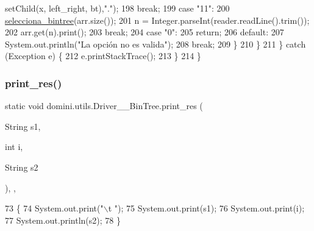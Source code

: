 \begin{DoxyCode}
      setChild(x, left\_right, bt),\textcolor{stringliteral}{"."});
198                     \textcolor{keywordflow}{break};
199                     \textcolor{keywordflow}{case} \textcolor{stringliteral}{"11"}:
200                         \hyperlink{classdomini_1_1utils_1_1Driver____BinTree_a0d90bf2cb928174547e712140b5a4fe5}{selecciona\_bintree}(arr.size());
201                         n = Integer.parseInt(reader.readLine().trim());
202                         arr.get(n).print();
203                     \textcolor{keywordflow}{break};
204                     \textcolor{keywordflow}{case} \textcolor{stringliteral}{"0"}:
205                         \textcolor{keywordflow}{return};
206                     \textcolor{keywordflow}{default}:
207                         System.out.println(\textcolor{stringliteral}{"La opción no es valida"});
208                     \textcolor{keywordflow}{break};
209                 \}
210             \}
211         \} \textcolor{keywordflow}{catch} (Exception e) \{
212             e.printStackTrace();
213         \}
214     \}
\end{DoxyCode}
\mbox{\label{classdomini_1_1utils_1_1Driver____BinTree_a434e26afb3eb701558d81b0fd1c29dcb}} 
\subsubsection{\texorpdfstring{print\+\_\+res()}{print\_res()}\hspace{0.1cm}{\footnotesize\ttfamily [1/2]}}
{\footnotesize\ttfamily static void domini.\+utils.\+Driver\+\_\+\+\_\+\+Bin\+Tree.\+print\+\_\+res (\begin{DoxyParamCaption}\item[{String}]{s1,  }\item[{int}]{i,  }\item[{String}]{s2 }\end{DoxyParamCaption})\hspace{0.3cm}{\ttfamily [inline]}, {\ttfamily [static]}, {\ttfamily [private]}}


\begin{DoxyCode}
73                                                                \{
74         System.out.print(\textcolor{stringliteral}{"\(\backslash\)t "});
75         System.out.print(s1);
76         System.out.print(i);
77         System.out.println(s2);
78     \}
\end{DoxyCode}
\mbox{\label{classdomini_1_1utils_1_1Driver____BinTree_a2d59fc46084a11fab2c22ce35c693f60}} 
